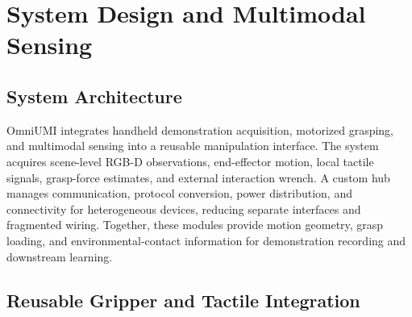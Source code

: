 
\section{System Design and Multimodal Sensing}
\label{sec:system}

\subsection{System Architecture}

OmniUMI integrates handheld demonstration acquisition, motorized grasping, and multimodal sensing into a reusable manipulation interface.
The system acquires scene-level RGB-D observations, end-effector motion, local tactile signals, grasp-force estimates, and external interaction wrench.
A custom hub manages communication, protocol conversion, power distribution, and connectivity for heterogeneous devices, reducing separate interfaces and fragmented wiring.
Together, these modules provide motion geometry, grasp loading, and environmental-contact information for demonstration recording and downstream learning.

\subsection{Reusable Gripper and Tactile Integration}

